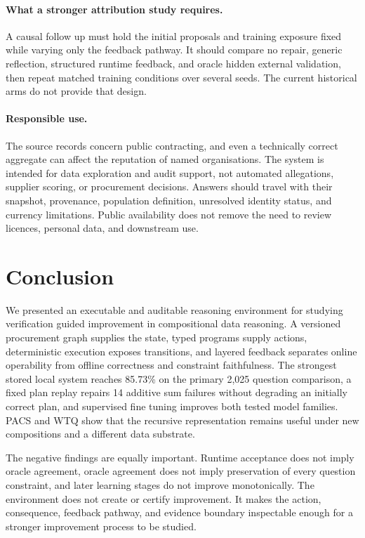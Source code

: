 \documentclass{article}
\begin{document}
\paragraph{What a stronger attribution study requires.}
A causal follow up must hold the initial proposals and training exposure fixed while varying only
the feedback pathway.  It should compare no repair, generic reflection, structured runtime feedback,
and oracle hidden external validation, then repeat matched training conditions over several seeds.
The current historical arms do not provide that design.

\paragraph{Responsible use.}
The source records concern public contracting, and even a technically correct aggregate can affect
the reputation of named organisations.  The system is intended for data exploration and audit
support, not automated allegations, supplier scoring, or procurement decisions.  Answers should
travel with their snapshot, provenance, population definition, unresolved identity status, and
currency limitations.  Public availability does not remove the need to review licences, personal
data, and downstream use.

\section{Conclusion}
\label{sec:conclusion}

We presented an executable and auditable reasoning environment for studying verification guided
improvement in compositional data reasoning.  A versioned procurement graph supplies the state,
typed programs supply actions, deterministic execution exposes transitions, and layered feedback
separates online operability from offline correctness and constraint faithfulness.  The strongest
stored local system reaches 85.73\% on the primary 2,025 question comparison, a fixed plan replay
repairs 14 additive sum failures without degrading an initially correct plan, and supervised fine
tuning improves both tested model families.  PACS and WTQ show that the recursive representation
remains useful under new compositions and a different data substrate.

The negative findings are equally important.  Runtime acceptance does not imply oracle agreement,
oracle agreement does not imply preservation of every question constraint, and later learning
stages do not improve monotonically.  The environment does not create or certify improvement.  It
makes the action, consequence, feedback pathway, and evidence boundary inspectable enough for a
stronger improvement process to be studied.
\end{document}

